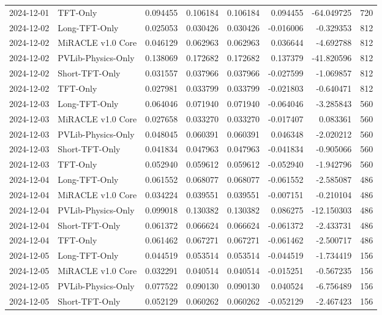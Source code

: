 \begin{tabular}{llrrrrrr}
2024-12-01 & TFT-Only & 0.094455 & 0.106184 & 0.106184 & 0.094455 & -64.049725 & 720 \\
2024-12-02 & Long-TFT-Only & 0.025053 & 0.030426 & 0.030426 & -0.016006 & -0.329353 & 812 \\
2024-12-02 & MiRACLE v1.0 Core & 0.046129 & 0.062963 & 0.062963 & 0.036644 & -4.692788 & 812 \\
2024-12-02 & PVLib-Physics-Only & 0.138069 & 0.172682 & 0.172682 & 0.137379 & -41.820596 & 812 \\
2024-12-02 & Short-TFT-Only & 0.031557 & 0.037966 & 0.037966 & -0.027599 & -1.069857 & 812 \\
2024-12-02 & TFT-Only & 0.027981 & 0.033799 & 0.033799 & -0.021803 & -0.640471 & 812 \\
2024-12-03 & Long-TFT-Only & 0.064046 & 0.071940 & 0.071940 & -0.064046 & -3.285843 & 560 \\
2024-12-03 & MiRACLE v1.0 Core & 0.027658 & 0.033270 & 0.033270 & -0.017407 & 0.083361 & 560 \\
2024-12-03 & PVLib-Physics-Only & 0.048045 & 0.060391 & 0.060391 & 0.046348 & -2.020212 & 560 \\
2024-12-03 & Short-TFT-Only & 0.041834 & 0.047963 & 0.047963 & -0.041834 & -0.905066 & 560 \\
2024-12-03 & TFT-Only & 0.052940 & 0.059612 & 0.059612 & -0.052940 & -1.942796 & 560 \\
2024-12-04 & Long-TFT-Only & 0.061552 & 0.068077 & 0.068077 & -0.061552 & -2.585087 & 486 \\
2024-12-04 & MiRACLE v1.0 Core & 0.034224 & 0.039551 & 0.039551 & -0.007151 & -0.210104 & 486 \\
2024-12-04 & PVLib-Physics-Only & 0.099018 & 0.130382 & 0.130382 & 0.086275 & -12.150303 & 486 \\
2024-12-04 & Short-TFT-Only & 0.061372 & 0.066624 & 0.066624 & -0.061372 & -2.433731 & 486 \\
2024-12-04 & TFT-Only & 0.061462 & 0.067271 & 0.067271 & -0.061462 & -2.500717 & 486 \\
2024-12-05 & Long-TFT-Only & 0.044519 & 0.053514 & 0.053514 & -0.044519 & -1.734419 & 156 \\
2024-12-05 & MiRACLE v1.0 Core & 0.032291 & 0.040514 & 0.040514 & -0.015251 & -0.567235 & 156 \\
2024-12-05 & PVLib-Physics-Only & 0.077522 & 0.090130 & 0.090130 & 0.040524 & -6.756489 & 156 \\
2024-12-05 & Short-TFT-Only & 0.052129 & 0.060262 & 0.060262 & -0.052129 & -2.467423 & 156 \\

\end{tabular}
